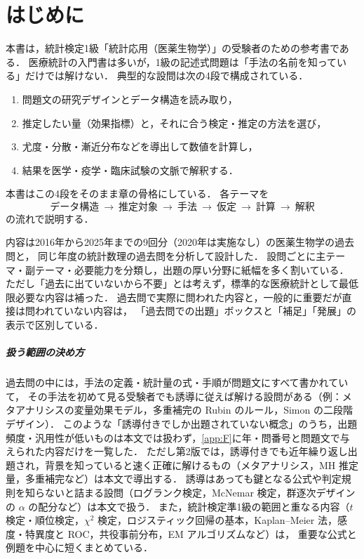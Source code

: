 \documentclass[a4paper,11pt,openany]{ltjsbook}
\begin{document}
\chapter*{はじめに}

本書は，統計検定1級「統計応用（医薬生物学）」の受験者のための参考書である．
医療統計の入門書は多いが，1級の記述式問題は「手法の名前を知っている」だけでは解けない．
典型的な設問は次の4段で構成されている．
\begin{enumerate}[label=(\arabic*)]
\item 問題文の研究デザインとデータ構造を読み取り，
\item 推定したい量（効果指標）と，それに合う検定・推定の方法を選び，
\item 尤度・分散・漸近分布などを導出して数値を計算し，
\item 結果を医学・疫学・臨床試験の文脈で解釈する．
\end{enumerate}
本書はこの4段をそのまま章の骨格にしている．
各テーマを
\[
\boxed{\ \text{データ構造}\ \rightarrow\ \text{推定対象}\ \rightarrow\ \text{手法}\ \rightarrow\ \text{仮定}\ \rightarrow\ \text{計算}\ \rightarrow\ \text{解釈}\ }
\]
の流れで説明する．

内容は2016年から2025年までの9回分（2020年は実施なし）の医薬生物学の過去問と，
同じ年度の統計数理の過去問を分析して設計した．
設問ごとに主テーマ・副テーマ・必要能力を分類し，出題の厚い分野に紙幅を多く割いている．
ただし「過去に出ていないから不要」とは考えず，標準的な医療統計として最低限必要な内容は補った．
過去問で実際に問われた内容と，一般的に重要だが直接は問われていない内容は，
「過去問での出題」ボックスと「補足」「発展」の表示で区別している．

\paragraph{扱う範囲の決め方}
過去問の中には，手法の定義・統計量の式・手順が問題文にすべて書かれていて，
その手法を初めて見る受験者でも誘導に従えば解ける設問がある（例：メタアナリシスの変量効果モデル，多重補完の Rubin のルール，Simon の二段階デザイン）．
このような「誘導付きでしか出題されていない概念」のうち，出題頻度・汎用性が低いものは本文では扱わず，\cref{app:F}に年・問番号と問題文で与えられた内容だけを一覧した．
ただし第2版では，誘導付きでも近年繰り返し出題され，背景を知っていると速く正確に解けるもの（メタアナリシス，MH 推定量，多重補完など）は本文で導出する．
誘導はあっても鍵となる公式や判定規則を知らないと詰まる設問（ログランク検定，McNemar 検定，群逐次デザインの $\alpha$ の配分など）は本文で扱う．
また，統計検定準1級の範囲と重なる内容（$t$ 検定・順位検定，$\chi^2$ 検定，ロジスティック回帰の基本，Kaplan--Meier 法，感度・特異度と ROC，共役事前分布，EM アルゴリズムなど）は，
重要な公式と例題を中心に短くまとめている．
\end{document}
